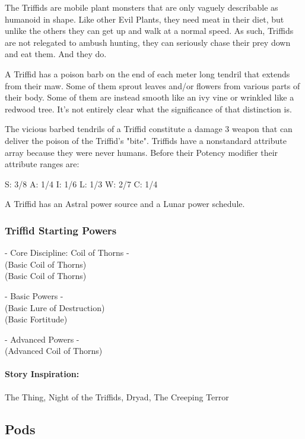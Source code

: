 The Triffids are mobile plant monsters that are only vaguely describable as humanoid in shape. Like other Evil Plants, they need meat in their diet, but unlike the others they can get up and walk at a normal speed. As such, Triffids are not relegated to ambush hunting, they can seriously chase their prey down and eat them. And they do.

A Triffid has a poison barb on the end of each meter long tendril that extends from their maw. Some of them sprout leaves and/or flowers from various parts of their body. Some of them are instead smooth like an ivy vine or wrinkled like a redwood tree. It's not entirely clear what the significance of that distinction is.

The vicious barbed tendrils of a Triffid constitute a damage 3 weapon that can deliver the poison of the Triffid's "bite". Triffids have a nonstandard attribute array because they were never humans. Before their Potency modifier their attribute ranges are:

S: 3/8 A: 1/4 I: 1/6 L: 1/3 W: 2/7 C: 1/4

A Triffid has an Astral power source and a Lunar power schedule.

\subsubsection{Triffid Starting Powers}

\hspace{\parindent} - Core Discipline: Coil of Thorns -\\
 (Basic Coil of Thorns)\\
 (Basic Coil of Thorns)

- Basic Powers -\\
 (Basic Lure of Destruction)\\
 (Basic Fortitude)

- Advanced Powers -\\
 (Advanced Coil of Thorns)

\paragraph{Story Inspiration:} The Thing, Night of the Triffids, Dryad, The Creeping Terror

\subsection{Pods} 

